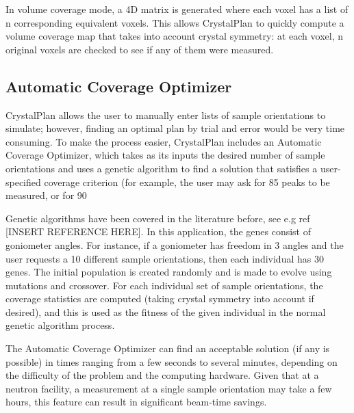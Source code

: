 \documentclass{iucr}              %
\begin{document}
In volume coverage mode, a 4D matrix is generated where each voxel has a list of
n corresponding equivalent voxels. This allows CrystalPlan to quickly compute a
volume coverage map that takes into account crystal symmetry: at each voxel, n
original voxels are checked to see if any of them were measured.         



\subsection{Automatic Coverage Optimizer}

CrystalPlan allows the user to manually enter lists of sample orientations to
simulate; however, finding an optimal plan by trial and error would be very time
consuming. To make the process easier, CrystalPlan includes an Automatic
Coverage Optimizer, which takes as its inputs the desired number of sample
orientations and uses a genetic algorithm to find a solution that satisfies a
user-specified coverage criterion (for example, the user may ask for 85%
peaks to be measured, or for 90%

Genetic algorithms have been covered in the literature before, see e.g ref
[INSERT REFERENCE HERE]. In this application, the genes consist of goniometer
angles. For instance, if a goniometer has freedom in 3 angles and the user
requests a 10 different sample orientations, then each individual has 30 genes.
The initial population is created randomly and is made to evolve using mutations
and crossover. For each individual set of sample orientations, the coverage
statistics are computed (taking crystal symmetry into account if desired), and
this is used as the fitness of the given individual in the normal genetic
algorithm process.             

The Automatic Coverage Optimizer can find an acceptable solution (if any is
possible) in times ranging from a few seconds to several minutes, depending on
the difficulty of the problem and the computing hardware. Given that at a
neutron facility, a measurement at a single sample orientation may take a few
hours, this feature can result in significant beam-time savings.           




\end{document}
